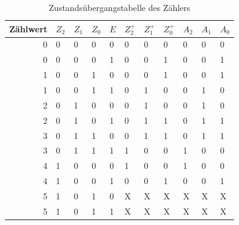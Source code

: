 \documentclass[
    paper=a4,
]{scrartcl}
\begin{document}
    \begin{table}[h]
        \centering
        \caption{Zustandsübergangstabelle des Zählers}
        \label{tab:2}
        \begin{tabular}{r|*{3}{l}|l|*{3}{l}|*{3}{l}}\toprule
            Zählwert    &   $Z_2$   &    $Z_1$  &    $Z_0$  &   $E$     &   $Z_2^+$ &   $Z_1^+$ &   $Z_0^+$ &   $A_2$   &   $A_1$   &   $A_0$\\\midrule
            0           &    0      &   0       &   0       &   0       &   0       &   0       &   0       &   0       &   0       &   0\\
            0           &   0       &   0       &   0       &   1       &   0       &   0       &   1       &   0       &   0       &   1\\
            1           &   0       &   0       &   1       &   0       &   0       &   0       &   1       &   0       &   0       &   1\\
            1           &   0       &   0       &   1       &   1       &   0       &   1       &   0       &   0       &   1       &   0\\
            2           &   0       &   1       &   0       &   0       &   0       &   1       &   0       &   0       &   1       &   0\\
            2           &   0       &   1       &   0       &   1       &   0       &   1       &   1       &   0       &   1       &   1\\
            3           &   0       &   1       &   1       &   0       &   0       &   1       &   1       &   0       &   1       &   1\\
            3           &   0       &   1       &   1       &   1       &   1       &   0       &   0       &   1       &   0       &   0\\
            4           &   1       &   0       &   0       &   0       &   1       &   0       &   0       &   1       &   0       &   0\\
            4           &   1       &   0       &   0       &   1       &   0       &   0       &   1       &   0       &   0       &   1\\\midrule
            5           &   1       &   0       &   1       &   0       &   X       &   X       &   X       &   X       &   X       &   X\\
            5           &   1       &   0       &   1       &   1       &   X       &   X       &   X       &   X       &   X       &   X\\

\end{tabular}
\end{table}
\end{document}
